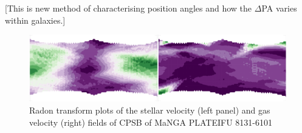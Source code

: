 [This is new method of characterising position angles and how the $\Delta$PA varies within galaxies.]


\begin{figure}
    \centering
   	\includegraphics[width=\columnwidth]{images/RadonPlots/RT-snips/CPSB-8313-6101-RT-snip.png}
    \caption{Radon transform plots of the stellar velocity (left panel) and gas velocity (right) fields of CPSB of MaNGA PLATEIFU 8131-6101}
    \label{fig:RT_8131-6101}
\end{figure}

